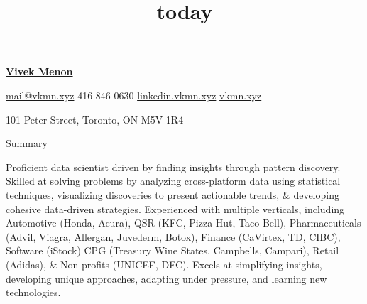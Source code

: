 \documentclass[letterpaper]{article}
\title{today}
\begin{document}




\vspace{-13mm}

\textbf{\Huge \Huge \href{http://www.vkmn.xyz}{Vivek Menon}}

\smallskip
\href{mailto:mail@vkmn.xyz}{mail@vkmn.xyz} \hspace{3.1cm} 416-846-0630
\newline \href{https://ca.linkedin.com/in/vvkmnn}{linkedin.vkmn.xyz} \hspace{3.2cm} \href{http://www.vkmn.xyz}{vkmn.xyz}

101 Peter Street,
Toronto, ON \hspace{1.3cm} M5V 1R4


\begin{rubrique}{Summary}
\end{rubrique}
\noindent
\hspace{-0.1cm}
Proficient data scientist driven by finding insights through pattern discovery. Skilled at solving problems by analyzing cross-platform data using statistical techniques, visualizing discoveries to present actionable trends, \& developing cohesive data-driven strategies. Experienced with multiple verticals, including Automotive (Honda, Acura), QSR (KFC, Pizza Hut, Taco Bell), Pharmaceuticals (Advil, Viagra, Allergan, Juvederm, Botox), Finance (CaVirtex, TD, CIBC), Software (iStock) CPG (Treasury Wine States, Campbells, Campari), Retail (Adidas), \& Non-profits (UNICEF, DFC). Excels at simplifying insights, developing unique approaches, adapting under pressure, and learning new technologies.

\vspace{-7mm}
\end{document}

